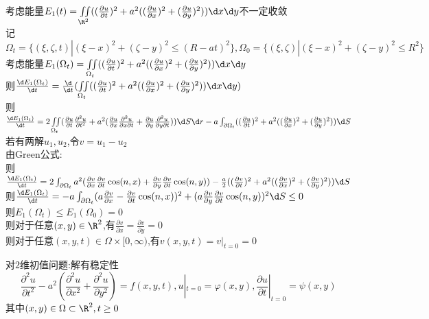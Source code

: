 \begin{jie}
考虑能量$E_1(t)=\iint\limits_{\R^2}((\frac{\partial u}{\partial t})^2+a^2((\frac{\partial u}{\partial x})^2+(\frac{\partial u}{\partial y})^2))\d x\d y$不一定收敛\\
记$\Omega_t=\{(\xi,\zeta,t)|(\xi-x)^2+(\zeta-y)^2\leq (R-at)^2\},\Omega_0=\{(\xi,\zeta)|(\xi-x)^2+(\zeta-y)^2\leq R^2\}$\\
考虑能量$E_1(\Omega_t)=\iint\limits_{\Omega_t}((\frac{\partial u}{\partial t})^2+a^2((\frac{\partial u}{\partial x})^2+(\frac{\partial u}{\partial y})^2))\d x\d y$\\
则$\frac{\d E_1(\Omega_t)}{\d t}=\frac{\d}{\d t}(\iint\limits_{\Omega_t}((\frac{\partial u}{\partial t})^2+a^2((\frac{\partial u}{\partial x})^2+(\frac{\partial u}{\partial y})^2))\d x\d y)$\\
则$\frac{\d E_1(\Omega_t)}{\d t}=2\iint\limits_{\Omega_t}(\frac{\partial u}{\partial t}\frac{\partial^2 u}{\partial t^2}+a^2(\frac{\partial u}{\partial x}\frac{\partial^2u}{\partial x\partial t}+\frac{\partial u}{\partial y}\frac{\partial^2 u}{\partial y\partial t}))\d S\d r-a\int_{\partial \Omega_t}((\frac{\partial u}{\partial t})^2+a^2((\frac{\partial u}{\partial x})^2+(\frac{\partial u}{\partial y})^2))\d S$\\
若有两解$u_1,u_2$,令$v=u_1-u_2$\\
由Green公式:\\
则$\frac{\d E_1(\Omega_t)}{\d t}=2\int_{\partial \Omega_t}a^2(\frac{\partial v}{\partial x}\frac{\partial v}{\partial t}\cos(n,x)+\frac{\partial v}{\partial y}\frac{\partial v}{\partial t}\cos(n,y))-\frac{a}{2}((\frac{\partial v}{\partial t})^2+a^2((\frac{\partial v}{\partial x})^2+(\frac{\partial v}{\partial y})^2))\d S$\\
则$\frac{\d E_1(\Omega_t)}{\d t}=-a\int_{\partial \Omega_t}(a\frac{\partial v}{\partial x}-\frac{\partial v}{\partial t}\cos(n,x))^2+(a\frac{\partial v}{\partial y}\frac{\partial v}{\partial t}\cos(n,y))^2\d S\leq 0$\\
则$E_1(\Omega_t)\leq E_1(\Omega_0)=0$\\
则对于任意$(x,y)\in \R^2$,有$\frac{\partial v}{\partial x}=\frac{\partial v}{\partial y}=0$\\
则对于任意$(x,y,t)\in \Omega\times[0,\infty)$,有$v(x,y,t)=v|_{t=0}=0$
\end{jie}

\begin{dingli*}
对$2$维初值问题:解有稳定性
\[\frac{\partial^2 u}{\partial t^2}-a^2(\frac{\partial^2 u}{\partial x^2}+\frac{\partial^2 u}{\partial y^2})=f(x,y,t),u|_{t=0}=\varphi(x,y),\frac{\partial u}{\partial t}|_{t=0}=\psi(x,y)\]
其中$(x,y)\in\Omega \subset\R^2,t\geq 0$
\end{dingli*}

